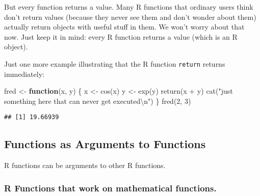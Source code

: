 \documentclass[
]{article}
\newenvironment{Shaded}{\begin{snugshade}}{\end{snugshade}}
\newcommand{\ControlFlowTok}[1]{\textcolor[rgb]{0.13,0.29,0.53}{\textbf{#1}}}
\newcommand{\DecValTok}[1]{\textcolor[rgb]{0.00,0.00,0.81}{#1}}
\newcommand{\FunctionTok}[1]{\textcolor[rgb]{0.00,0.00,0.00}{#1}}
\newcommand{\NormalTok}[1]{#1}
\newcommand{\OtherTok}[1]{\textcolor[rgb]{0.56,0.35,0.01}{#1}}
\newcommand{\SpecialCharTok}[1]{\textcolor[rgb]{0.00,0.00,0.00}{#1}}
\newcommand{\StringTok}[1]{\textcolor[rgb]{0.31,0.60,0.02}{#1}}
\begin{document}
But every function returns a value. Many R functions that ordinary users
think don't return values (because they never see them and don't wonder
about them) actually return objects with useful stuff in them. We won't
worry about that now. Just keep it in mind: every R function returns a
value (which is an R object).

Just one more example illustrating that the R function \texttt{return}
returns immediately:

\begin{Shaded}
\begin{Highlighting}[]
\NormalTok{fred }\OtherTok{\textless{}{-}} \ControlFlowTok{function}\NormalTok{(x, y) \{}
\NormalTok{   x }\OtherTok{\textless{}{-}} \FunctionTok{cos}\NormalTok{(x)}
\NormalTok{   y }\OtherTok{\textless{}{-}} \FunctionTok{exp}\NormalTok{(y)}
   \FunctionTok{return}\NormalTok{(x }\SpecialCharTok{+}\NormalTok{ y)}
   \FunctionTok{cat}\NormalTok{(}\StringTok{"just something here that can never get executed}\SpecialCharTok{\textbackslash{}n}\StringTok{"}\NormalTok{)}
\NormalTok{\}}
\FunctionTok{fred}\NormalTok{(}\DecValTok{2}\NormalTok{, }\DecValTok{3}\NormalTok{)}
\end{Highlighting}
\end{Shaded}

\begin{verbatim}
## [1] 19.66939
\end{verbatim}

\hypertarget{functions-as-arguments-to-functions}{%
\subsection{Functions as Arguments to
Functions}\label{functions-as-arguments-to-functions}}

R functions can be arguments to other R functions.

\hypertarget{r-functions-that-work-on-mathematical-functions.}{%
\subsubsection{R Functions that work on mathematical
functions.}\label{r-functions-that-work-on-mathematical-functions.}}
\end{document}

